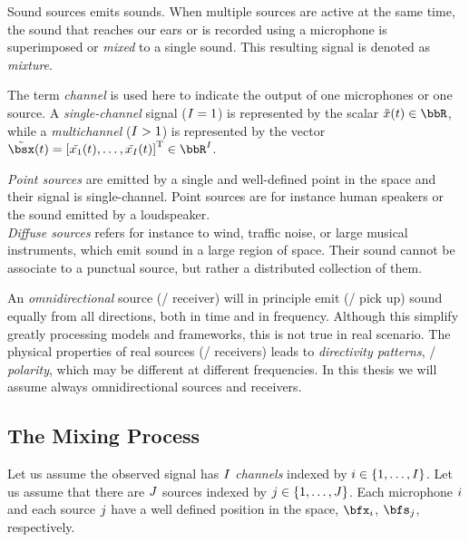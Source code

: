 Sound sources emits sounds.
When multiple sources are active at the same time, the sound that reaches our ears or is recorded using a microphone is superimposed or \textit{mixed} to a single sound.
This resulting signal is denoted as \textit{mixture}.

The term \textit{channel} is used here to indicate the output of one microphones or one source.
A \textit{single-channel} signal ($I = 1$) is represented by the scalar $\contTime[t]{\mic} \in \R$,
while a \textit{multichannel} ($I >   1$) is represented by the vector $\contTime[t]{\mics} = \ktranspose{\klist{\contTime[t]{\mic_1}, \dots, \contTime[t]{\mic_{\numMics}}}} \in \R^{\numMics}$.

\textit{Point sources} are emitted by a single and well-defined point in the space and their signal is single-channel.
Point sources are for instance human speakers or the sound emitted by a loudspeaker.
\\\textit{Diffuse sources} refers for instance to wind, traffic noise, or large musical instruments, which emit sound in a large region of space.
Their sound cannot be associate to a punctual source, but rather a distributed collection of them.

An \textit{omnidirectional} source (\resp/ receiver) will in principle emit (\resp/ pick up) sound equally from all directions,
both in time and in frequency.
Although this simplify greatly processing models and frameworks, this is not true in real scenario.
The physical properties of real sources (\resp/ receivers) leads to \textit{directivity patterns}, \aka/ \textit{polarity}, which may
be different at different frequencies.
In this thesis we will assume always omnidirectional sources and receivers.

\subsection{The Mixing Process}
Let us assume the observed signal has $I$ \textit{channels} indexed by $\idxMic \in \kbrace{1,\dots,\numMics}$.
Let us assume that there are $J$ sources indexed by $\idxSrc \in \kbrace{1,\dots,\numSrcs}$.
Each microphone $i$ and each source $j$ have a well defined position in the space, $\positionMicrophone_\idxMic$, $\positionSource_\idxSrc$, respectively.

